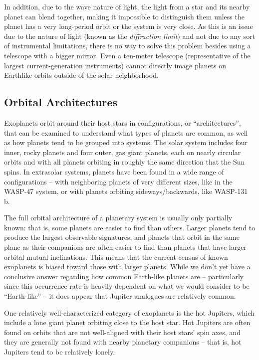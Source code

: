 In addition, due to the wave nature of light, the light from a star and its nearby planet can blend together, making it impossible to distinguish them unless the planet has a very long-period orbit or the system is very close.  As this is an issue due to the nature of light (known as the \textit{diffraction limit}) and not due to any sort of instrumental limitations, there is no way to solve this problem besides using a telescope with a bigger mirror.  Even a ten-meter telescope (representative of the largest current-generation instruments) cannot directly image planets on Earthlike orbits outside of the solar neighborhood.

\subsection{Orbital Architectures}
Exoplanets orbit around their host stars in configurations, or ``architectures'', that can be examined to understand what types of planets are common, as well as how planets tend to be grouped into systems. The solar system includes four inner, rocky planets and four outer, gas giant planets, each on nearly circular orbits and with all planets orbiting in roughly the same direction that the Sun spins. In extrasolar systems, planets have been found in a wide range of configurations -- with neighboring planets of very different sizes, like in the WASP-47 system, or with planets orbiting sideways/backwards, like WASP-131 b.

The full orbital architecture of a planetary system is usually only partially known: that is, some planets are easier to find than others. Larger planets tend to produce the largest observable signatures, and planets that orbit in the same plane as their companions are often easier to find than planets that have larger orbital mutual inclinations. This means that the current census of known exoplanets is biased toward those with larger planets. While we don't yet have a conclusive answer regarding how common Earth-like planets are -- particularly since this occurrence rate is heavily dependent on what we would consider to be ``Earth-like'' -- it does appear that Jupiter analogues are relatively common.

One relatively well-characterized category of exoplanets is the hot Jupiters, which include a lone giant planet orbiting close to the host star. Hot Jupiters are often found on orbits that are not well-aligned with their host stars' spin axes, and they are generally not found with nearby planetary companions -- that is, hot Jupiters tend to be relatively lonely. 

